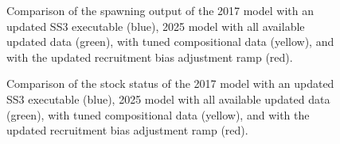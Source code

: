 \documentclass[
]{scrartcl}
\begin{document}
\begin{figure}


\caption{\label{fig-newdata_5}Comparison of the spawning output of the
2017 model with an updated SS3 executable (blue), 2025 model with all
available updated data (green), with tuned compositional data (yellow),
and with the updated recruitment bias adjustment ramp (red).}

\end{figure}%

\begin{figure}


\caption{\label{fig-newdata_6}Comparison of the stock status of the 2017
model with an updated SS3 executable (blue), 2025 model with all
available updated data (green), with tuned compositional data (yellow),
and with the updated recruitment bias adjustment ramp (red).}

\end{figure}%
\end{document}
